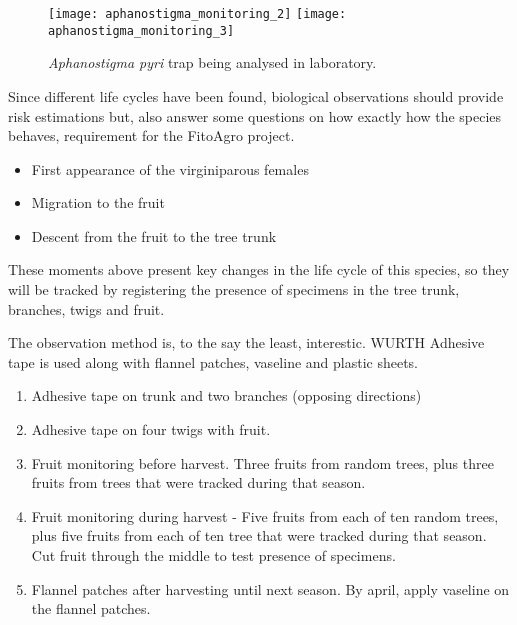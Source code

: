 \begin{figure}[htbp]
  \centering
    {\texttt{[image: aphanostigma\_monitoring\_2]}}%
  \hfill
    {\texttt{[image: aphanostigma\_monitoring\_3]}}%
  \caption{\textit{Aphanostigma pyri} trap being analysed in laboratory.}
  \label{fig:cydia_figs}
\end{figure}

Since different life cycles have been found, biological observations should provide risk estimations but, also answer some questions on how exactly how the species behaves, requirement for the FitoAgro project.

\begin{itemize}
	\item First appearance of the virginiparous females
	\item Migration to the fruit
	\item Descent from the fruit to the tree trunk
\end{itemize}

These moments above present key changes in the life cycle of this species, so they will be tracked by registering the presence of specimens in the tree trunk, branches, twigs and fruit.

The observation method is, to the say the least, interestic. WURTH Adhesive tape is used along with flannel patches, vaseline and plastic sheets. 

\begin{enumerate}
	\item Adhesive tape on trunk and two branches (opposing directions)
	\item Adhesive tape on four twigs with fruit.
	\item Fruit monitoring before harvest. Three fruits from random trees, plus three fruits from trees that were tracked during that season.
	\item Fruit monitoring during harvest - Five fruits from each of ten random trees, plus five fruits from each of ten tree that were tracked during that season. Cut fruit through the middle to test presence of specimens.
	\item Flannel patches after harvesting until next season. By april, apply vaseline on the flannel patches.
\end{enumerate}


